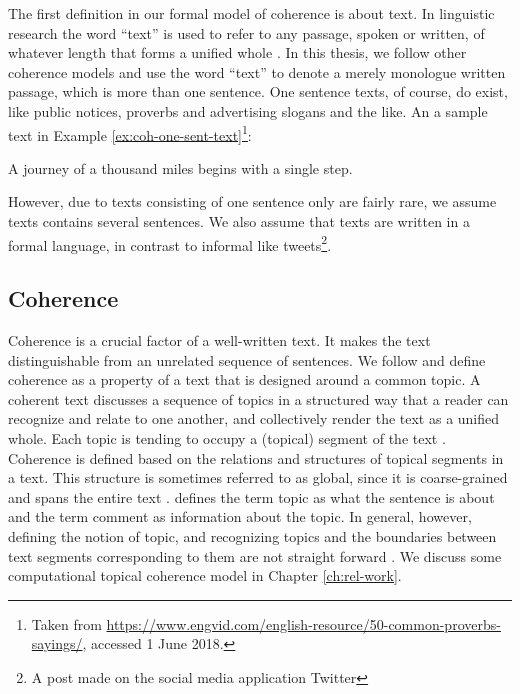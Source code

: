 The first definition in our formal model of coherence is about text. 
In linguistic research the word ``text'' is used to refer to any passage, spoken or written, of whatever length that forms a unified whole \cite{halliday76}. 
In this thesis, we follow other coherence models \cite{barzilay08,guinaudeau13} and use the word ``text'' to denote a merely monologue written passage, which is more than one sentence.
One sentence texts, of course, do exist, like public notices, proverbs and advertising slogans and the like. 
An a sample text in Example \ref{ex:coh-one-sent-text}\footnote{Taken from \url{https://www.engvid.com/english-resource/50-common-proverbs-sayings/}, accessed 1 June 2018.}: 

\begin{examples}
    \label{ex:coh-one-sent-text}
    A journey of a thousand miles begins with a single step.
\end{examples}

However, due to texts consisting of one sentence only are fairly rare, we assume texts contains several sentences.  
We also assume that texts are written in a formal language, in contrast to informal like tweets\footnote{A post made on the social media application Twitter}. 

\subsection{Coherence}

Coherence is a crucial factor of a well-written text. 
It makes the text distinguishable from an unrelated sequence of sentences. 
We follow  and define coherence as a property of a text that is designed around a common topic. 
A coherent text discusses a sequence of topics in a structured way that a reader can recognize and relate to one another, and collectively render the text as a unified whole. 
Each topic is tending to occupy a (topical) segment of the text \cite{hearst97}. 
Coherence is defined based on the relations and structures of topical segments in a text. 
This structure is sometimes referred to as global, since it is coarse-grained and spans the entire text \cite{}. 
 defines the term topic as what the sentence is about and the term comment as information about the topic.  
In general, however, defining the notion of topic, and recognizing topics and the boundaries between  text segments corresponding to them are not straight forward \cite{stede12}. 
We discuss some computational topical coherence model in Chapter \ref{ch:rel-work}. 


